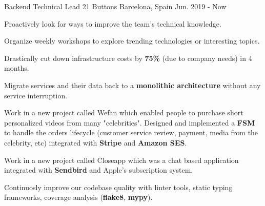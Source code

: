 

\begin{cventries}

  \cventry
    {Backend Technical Lead} %
    {21 Buttons} %
    {Barcelona, Spain} %
    {Jun. 2019 - Now} %
    {
      \begin{cvitems} %
        \item {Proactively look for ways to improve the team's technical knowledge.}
        \item {Organize weekly workshops to explore trending technologies or interesting topics.}
        \item {Drastically cut down infrastructure costs by \textbf{75\%} (due to company needs) in 4 months.}
        \item {Migrate services and their data back to a \textbf{monolithic architecture} without any service interruption.}
        \item {Work in a new project called Wefan which enabled people to purchase short personalized videos from many "celebrities". Designed and implemented a \textbf{FSM} to handle the orders lifecycle (customer service review, payment, media from the celebrity, etc) integrated with \textbf{Stripe} and \textbf{Amazon SES}.}
        \item {Work in a new project called Closeapp which was a chat based application integrated with \textbf{Sendbird} and Apple's subscription system.}
        \item {Continuosly improve our codebase quality with linter tools, static typing frameworks, coverage analysis (\textbf{flake8}, \textbf{mypy}).}
      \end{cvitems}
    }


\end{cventries}
